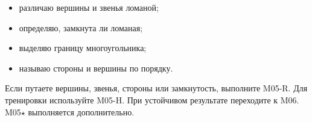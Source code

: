 \begin{reflectionbox}
  \begin{itemize}[label=\choicebox]
    \item различаю вершины и звенья ломаной;
    \item определяю, замкнута ли ломаная;
    \item выделяю границу многоугольника;
    \item называю стороны и вершины по порядку.
  \end{itemize}
\end{reflectionbox}

\begin{resultbox}
  Если путаете вершины, звенья, стороны или замкнутость, выполните M05-R.
  Для тренировки используйте M05-H. При устойчивом результате переходите
  к M06. M05\(\star\) выполняется дополнительно.
\end{resultbox}
